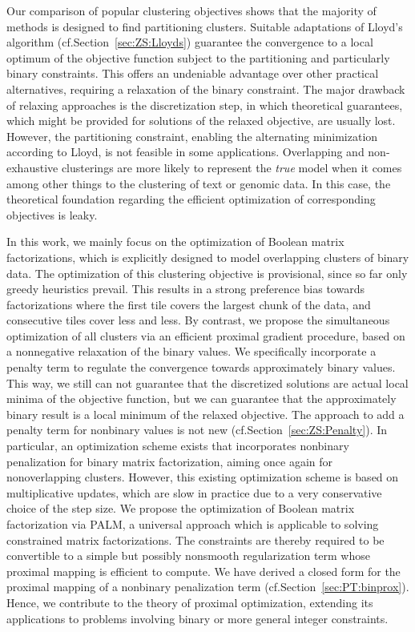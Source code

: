 Our comparison of popular clustering objectives shows that the majority of methods is designed to find partitioning clusters. Suitable adaptations of Lloyd's algorithm (cf.\@ Section~\ref{sec:ZS:Lloyds}) guarantee the convergence to a local optimum of the objective function subject to the partitioning and particularly binary constraints. This offers an undeniable advantage over other practical alternatives, requiring a relaxation of the binary constraint. The major drawback of relaxing approaches is the discretization step, in which theoretical guarantees, which might be provided for solutions of the relaxed objective, are usually lost. However, the partitioning constraint, enabling the alternating minimization according to Lloyd, is not feasible in some applications. Overlapping and non-exhaustive clusterings are more likely to represent the \emph{true} model when it comes among other things to the clustering of text or genomic data. In this case, the theoretical foundation regarding the efficient optimization of corresponding objectives is leaky.

In this work, we mainly focus on the optimization of Boolean matrix factorizations, which is explicitly designed to model overlapping clusters of binary data. The optimization of this clustering objective is provisional, since so far only greedy heuristics prevail. This results in a strong preference bias towards factorizations where the first tile covers the largest chunk of the data, and consecutive tiles cover less and less. By contrast, we propose the simultaneous optimization of all clusters via an efficient proximal gradient procedure, based on a nonnegative relaxation of the binary values. We specifically incorporate a penalty term to regulate the convergence towards approximately binary values. This way, we still can not guarantee that the discretized solutions are actual local minima of the objective function, but we can guarantee that the approximately binary result is a local minimum of the relaxed objective. The approach to add a penalty term for nonbinary values is not new (cf.\@ Section~\ref{sec:ZS:Penalty}). In particular, an optimization scheme exists that incorporates nonbinary penalization for binary matrix factorization, aiming once again for nonoverlapping clusters. However, this existing optimization scheme is based on multiplicative updates, which are slow in practice due to a very conservative choice of the step size. 
We propose the optimization of Boolean matrix factorization via PALM, a universal approach which is applicable to solving constrained matrix factorizations. The constraints are thereby required to be convertible to a simple but possibly nonsmooth regularization term whose proximal mapping is efficient to compute. We have derived a closed form for the proximal mapping of a nonbinary penalization term (cf.\@ Section~\ref{sec:PT:binprox}). Hence, we contribute to the theory of proximal optimization, extending its applications to problems involving binary or more general integer constraints.

